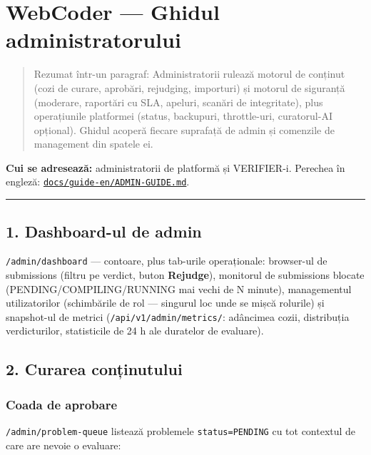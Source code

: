 \documentclass[
]{article}
\author{}
\date{}
\begin{document}
{
\setcounter{tocdepth}{2}
\tableofcontents
}
\section{WebCoder --- Ghidul
administratorului}\label{webcoder--ghidul-administratorului}

\begin{quote}
Rezumat într-un paragraf: Administratorii rulează motorul de conținut
(cozi de curare, aprobări, rejudging, importuri) și motorul de siguranță
(moderare, raportări cu SLA, apeluri, scanări de integritate), plus
operațiunile platformei (status, backupuri, throttle-uri, curatorul-AI
opțional). Ghidul acoperă fiecare suprafață de admin și comenzile de
management din spatele ei.
\end{quote}

\textbf{Cui se adresează:} administratorii de platformă și VERIFIER-i.
Perechea în engleză:
\href{../guide-en/ADMIN-GUIDE.md}{\texttt{docs/guide-en/ADMIN-GUIDE.md}}.

\begin{center}\rule{0.5\linewidth}{0.5pt}\end{center}

\subsection{1. Dashboard-ul de admin}\label{1-dashboard-ul-de-admin}

\texttt{/admin/dashboard} --- contoare, plus tab-urile operaționale:
browser-ul de submissions (filtru pe verdict, buton \textbf{Rejudge}),
monitorul de submissions blocate (PENDING/COMPILING/RUNNING mai vechi de
N minute), managementul utilizatorilor (schimbările de rol --- singurul
loc unde se mișcă rolurile) și snapshot-ul de metrici
(\texttt{/api/v1/admin/metrics/}: adâncimea cozii, distribuția
verdicturilor, statisticile de 24 h ale duratelor de evaluare).

\subsection{2. Curarea conținutului}\label{2-curarea-conux21binutului}

\subsubsection{Coada de aprobare}\label{coada-de-aprobare}

\texttt{/admin/problem-queue} listează problemele
\texttt{status=PENDING} cu tot contextul de care are nevoie o evaluare:
\end{document}

